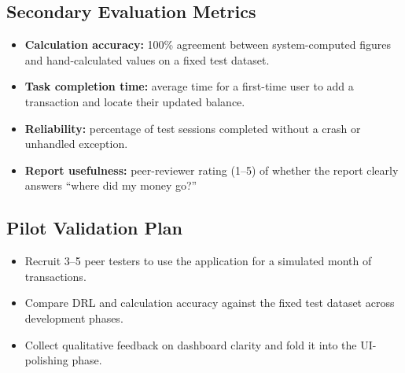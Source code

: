 \documentclass{article}
\begin{document}
\subsection{Secondary Evaluation Metrics}
\begin{itemize}[noitemsep]
  \item \textbf{Calculation accuracy:} 100\% agreement between system-computed figures and hand-calculated values on a fixed test dataset.
  \item \textbf{Task completion time:} average time for a first-time user to add a transaction and locate their updated balance.
  \item \textbf{Reliability:} percentage of test sessions completed without a crash or unhandled exception.
  \item \textbf{Report usefulness:} peer-reviewer rating (1--5) of whether the report clearly answers ``where did my money go?''
\end{itemize}

\subsection{Pilot Validation Plan}
\begin{itemize}[noitemsep]
  \item Recruit 3--5 peer testers to use the application for a simulated month of transactions.
  \item Compare DRL and calculation accuracy against the fixed test dataset across development phases.
  \item Collect qualitative feedback on dashboard clarity and fold it into the UI-polishing phase.
\end{itemize}
\end{document}
